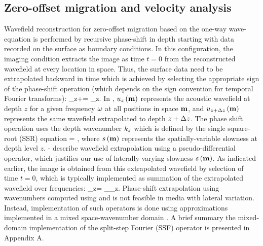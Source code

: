 \subsection{Zero-offset migration and velocity analysis}

Wavefield reconstruction for zero-offset migration based on the
one-way wave-equation is performed by recursive phase-shift in depth
starting with data recorded on the surface as boundary conditions. In
this configuration, the imaging condition extracts the image as time
$t=0$ from the reconstructed wavefield at every location in
space. Thus, the surface data need to be extrapolated backward in time
which is achieved by selecting the appropriate sign of the phase-shift
operation (which depends on the sign convention for temporal Fourier
transforms):
%
\beq \label{eqn:PHS-ZO}
\UU_{z+\dz}\ofm = \PS{-}\UU_z\ofm \;.
\eeq
%
In , ${u}_z\left ( {\bf m} \right)$ represents the acoustic wavefield at
depth $z$ for a given frequency $\omega$ at all positions in space ${\bf m}$,
and ${u}_{z+\Delta z}\left ( {\bf m} \right)$ represents the same wavefield extrapolated to
depth $z+\Delta z$. The phase shift operation uses the depth wavenumber
${k_z}$ which is defined by the single square-root (SSR) equation
%
\beq \label{eqn:SSR-ZO}
\kz = \SSR{2\ws\ofm}{\km}\;,
\eeq
%
where $s\left ( {\bf m} \right)$ represents the spatially-variable slowness at depth
level $z$. - describe wavefield extrapolation
using a pseudo-differential operator, which justifies our use of
laterally-varying slowness $s\left ( {\bf m} \right)$. As indicated earlier, the image is
obtained from this extrapolated wavefield by selection of time $t=0$,
which is typically implemented as summation of the extrapolated
wavefield over frequencies:
%
\beq \label{eqn:IMC-ZO}
\RR_z\ofm = \sum_\ww \UU_z\ofmw \;.
\eeq
%
Phase-shift extrapolation using wavenumbers computed using
 and  is not feasible in media with lateral
variation. Instead, implementation of such operators is done using
approximations implemented in a mixed space-wavenumber domain
\cite[]{GEO55-04-04100421,GEO59-12-18821893,GEO64-05-15241534}. A
brief summary the mixed-domain implementation of the split-step
Fourier (SSF) operator is presented in Appendix A.


